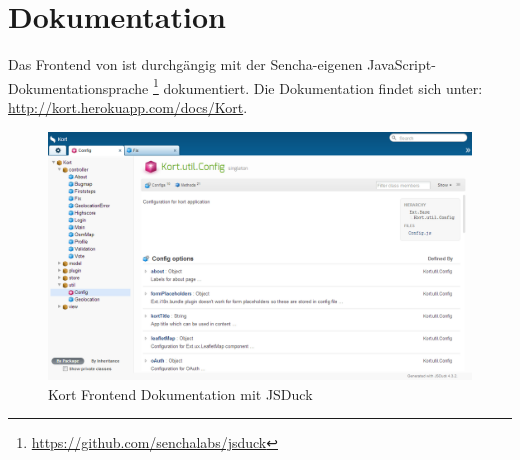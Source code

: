 \section{Dokumentation}

Das Frontend von \kort{} ist durchgängig mit der Sencha-eigenen JavaScript-Dokumentationsprache \footnote{\url{https://github.com/senchalabs/jsduck}} dokumentiert.
Die Dokumentation findet sich unter: \url{http://kort.herokuapp.com/docs/Kort}.

\begin{figure}[H]
	\centering
	\includegraphics[width=\textwidth]{images/implementation/frontend/kort-documentation}
	\caption{Kort Frontend Dokumentation mit JSDuck}
	\label{image-kort-documentation}
\end{figure}